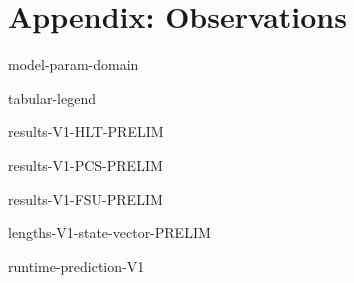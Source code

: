 \hypertarget{apx:Observations}{%
\chapter{Appendix: Observations}\label{apx:Observations}}


\newcommand{\ObservationTable}[3]{%
\begin{table}[!ht]
\centering
\caption{%
\label{tab:V#1-#3}%
Observations for \CGKAmod{#2}{T}{N}$ \models \LTLPredicate{#3}$.%
}%
{results-V#1-#3-PRELIM}
\end{table}
}

\begin{table}[!ht]
\centering
\caption{%
\label{tab:model-param-domain}%
Verification domain of \( \CGKAmod{P}{T}{N} \models \varphi \) parameters.
}%
{model-param-domain}
\end{table}

\begin{table}[!ht]
\centering
\caption{%
\label{tab:table-legend}%
Legend of symbols appearing in tables.
}%
{tabular-legend}
\end{table}

\ObservationTable{1}{\VersionOne}{HLT}
\ObservationTable{1}{\VersionOne}{PCS}
\ObservationTable{1}{\VersionOne}{FSU}

\begin{table}[ht!]
\centering
\caption[State vector byte length for each model]{%
\label{tab:state-vector-len}%
State vector byte length for each model parameterization of \CGKAmod{\VersionOne}{}{}.
}%
{lengths-V1-state-vector-PRELIM}
\end{table}

\begin{table}[ht!]                                                                        
\centering
\caption[Run-time predictions for ]{%
\label{tab:predicted-run-times}%
Run-time (wall clock) predictions for  using $T \in [4, 7]$ as predictors for $T \in [8, 12]$.
}%
{runtime-prediction-V1}
\end{table}